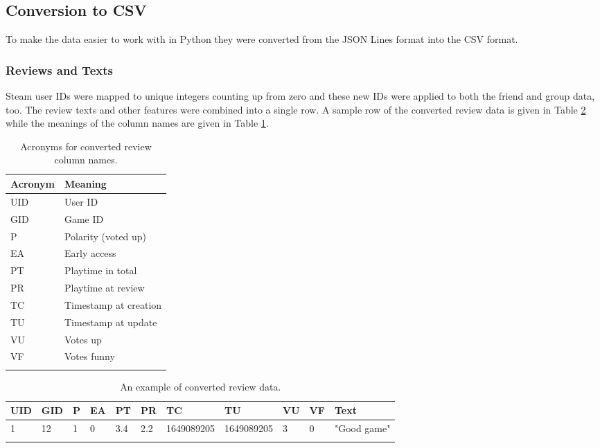 

\subsection{Conversion to CSV} \label{sec:BG_Dataset_CSV}

To make the data easier to work with in Python they were converted from the JSON Lines format into the CSV format.

\subsubsection{Reviews and Texts}

Steam user IDs were mapped to unique integers counting up from zero and these new IDs were applied to both the friend and group data, too. The review texts and other features were combined into a single row. A sample row of the converted review data is given in Table \ref{tab:ExampleData_Review} while the meanings of the column names are given in Table \ref{tab:ExampleData_Review_Abrv}.

\begin{table}[ht]
    \centering
    \begin{tabular}{l l}
        \toprule
        \textbf{Acronym} & \textbf{Meaning} \\\midrule
        UID & User ID\\
        GID & Game ID\\
        P & Polarity (voted up)\\
        EA & Early access\\
        PT & Playtime in total\\
        PR & Playtime at review\\
        TC & Timestamp at creation\\
        TU & Timestamp at update\\
        VU & Votes up\\
        VF & Votes funny\\
        \bottomrule\\
    \end{tabular}
    \caption{Acronyms for converted review column names.}
    \label{tab:ExampleData_Review_Abrv}
\end{table}

\begin{table}[ht]
    \centering
    \begin{tabular}{l l l l l l l l l l l}
        \toprule
        \textbf{UID} & \textbf{GID} & \textbf{P} & \textbf{EA} & \textbf{PT} & \textbf{PR} & \textbf{TC} & \textbf{TU} & \textbf{VU} & \textbf{VF} & \textbf{Text} \\\midrule
        1 & 12 & 1 & 0 & 3.4 & 2.2 & 1649089205 & 1649089205 & 3 & 0 & "Good game"\\
        \bottomrule\\
    \end{tabular}
    \caption{An example of converted review data.}
    \label{tab:ExampleData_Review}
\end{table}

